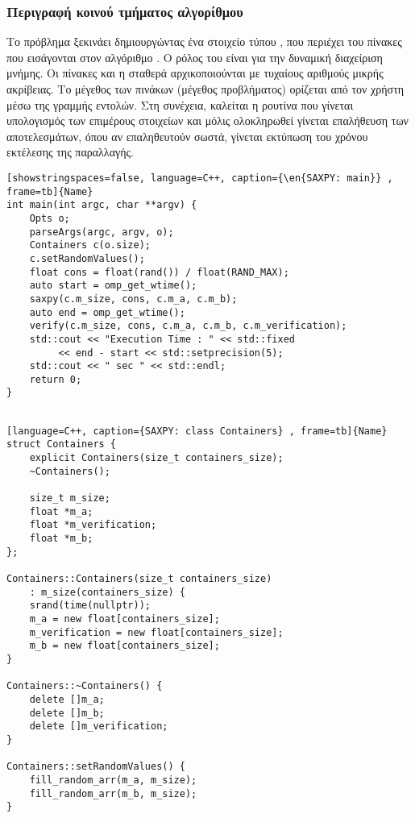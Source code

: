 \subsubsection{Περιγραφή κοινού τμήματος αλγορίθμου }
Το πρόβλημα ξεκινάει δημιουργώντας ένα στοιχείο τύπου \emph{}, που περιέχει του πίνακες που εισάγονται
στον αλγόριθμο . Ο ρόλος του  είναι για την δυναμική διαχείριση μνήμης. Οι πίνακες και η σταθερά  αρχικοποιούνται με τυχαίους αριθμούς μικρής ακρίβειας. Το μέγεθος των
πινάκων (μέγεθος προβλήματος) ορίζεται από τον χρήστη μέσω της γραμμής εντολών. Στη συνέχεια, καλείται η ρουτίνα που γίνεται υπολογισμός των επιμέρους στοιχείων  και μόλις ολοκληρωθεί γίνεται επαλήθευση των αποτελεσμάτων, όπου αν επαληθευτούν σωστά, γίνεται εκτύπωση του
χρόνου εκτέλεσης της παραλλαγής.
\\
\begin{spacing}{1.5}
\begin{lstlisting}[showstringspaces=false, language=C++, caption={\en{SAXPY: main}} , frame=tb]{Name}
int main(int argc, char **argv) {
    Opts o;
    parseArgs(argc, argv, o);
    Containers c(o.size);
    c.setRandomValues();
    float cons = float(rand()) / float(RAND_MAX);
    auto start = omp_get_wtime();
    saxpy(c.m_size, cons, c.m_a, c.m_b);
    auto end = omp_get_wtime();
    verify(c.m_size, cons, c.m_a, c.m_b, c.m_verification);
    std::cout << "Execution Time : " << std::fixed
         << end - start << std::setprecision(5);
    std::cout << " sec " << std::endl;
    return 0;
}
   
\end{lstlisting}
\end{spacing}
\clearpage
{}
\begin{spacing}{0.8}
\begin{lstlisting}[language=C++, caption={SAXPY: class Containers} , frame=tb]{Name}
struct Containers {
    explicit Containers(size_t containers_size);
    ~Containers();

    size_t m_size;
    float *m_a;
    float *m_verification;
    float *m_b;
};     

Containers::Containers(size_t containers_size)
    : m_size(containers_size) {
    srand(time(nullptr));
    m_a = new float[containers_size];
    m_verification = new float[containers_size];
    m_b = new float[containers_size];
}

Containers::~Containers() {
    delete []m_a;
    delete []m_b;
    delete []m_verification;
}

Containers::setRandomValues() {
    fill_random_arr(m_a, m_size);
    fill_random_arr(m_b, m_size);
}
\end{lstlisting}
\end{spacing}

